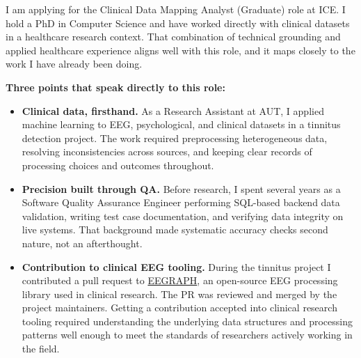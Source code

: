 \documentclass[10.5pt,a4paper]{article}
\begin{document}
\vspace{6pt}

I am applying for the Clinical Data Mapping Analyst (Graduate) role at ICE. I hold a PhD
in Computer Science and have worked directly with clinical datasets in a healthcare research
context. That combination of technical grounding and applied healthcare experience aligns well
with this role, and it maps closely to the work I have already been doing.

\vspace{10pt}

\textbf{\color{mid}Three points that speak directly to this role:}

\vspace{4pt}

\begin{tcolorbox}[
  blanker, breakable,
  left=10pt,
  borderline west={2.5pt}{0pt}{accentlt},
  before upper={\parskip=6pt},
  top=0pt, bottom=0pt
]
\begin{itemize}

  \item \textbf{Clinical data, firsthand.}
        As a Research Assistant at AUT, I applied machine learning to EEG, psychological, and
        clinical datasets in a tinnitus detection project. The work required preprocessing
        heterogeneous data, resolving inconsistencies across sources, and keeping clear
        records of processing choices and outcomes throughout.

  \item \textbf{Precision built through QA.}
        Before research, I spent several years as a Software Quality Assurance Engineer
        performing SQL-based backend data validation, writing test case documentation, and
        verifying data integrity on live systems. That background made systematic accuracy
        checks second nature, not an afterthought.

  \item \textbf{Contribution to clinical EEG tooling.}
        During the tinnitus project I contributed a pull request to
        \href{https://github.com/ufvceiec/EEGRAPH}{EEGRAPH}, an open-source EEG processing
        library used in clinical research. The PR was reviewed and merged by the project
        maintainers. Getting a contribution accepted into clinical research tooling required
        understanding the underlying data structures and processing patterns well enough to
        meet the standards of researchers actively working in the field.

\end{itemize}
\end{tcolorbox}
\end{document}
